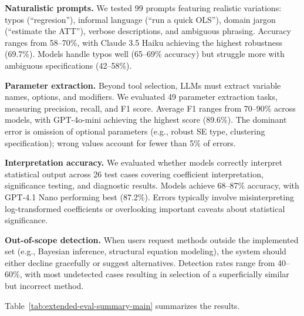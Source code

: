 \textbf{Naturalistic prompts.} We tested 99 prompts featuring realistic
variations: typos (``regresion''), informal language (``run a quick OLS''),
domain jargon (``estimate the ATT''), verbose descriptions, and ambiguous
phrasing. Accuracy ranges from 58--70\%, with Claude 3.5 Haiku achieving
the highest robustness (69.7\%). Models handle typos well (65--69\% accuracy)
but struggle more with ambiguous specifications (42--58\%).

\textbf{Parameter extraction.} Beyond tool selection, LLMs must extract
variable names, options, and modifiers. We evaluated 49 parameter extraction
tasks, measuring precision, recall, and F1 score. Average F1 ranges from
70--90\% across models, with GPT-4o-mini achieving the highest score (89.6\%).
The dominant error is omission of optional parameters (e.g., robust SE type,
clustering specification); wrong values account for fewer than 5\% of errors.

\textbf{Interpretation accuracy.} We evaluated whether models correctly
interpret statistical output across 26 test cases covering coefficient
interpretation, significance testing, and diagnostic results. Models
achieve 68--87\% accuracy, with GPT-4.1 Nano performing best (87.2\%).
Errors typically involve misinterpreting log-transformed coefficients
or overlooking important caveats about statistical significance.

\textbf{Out-of-scope detection.} When users request methods outside the
implemented set (e.g., Bayesian inference, structural equation modeling), the system should
either decline gracefully or suggest alternatives. Detection rates range
from 40--60\%, with most undetected cases resulting in selection of a
superficially similar but incorrect method.

Table~\ref{tab:extended-eval-summary-main} summarizes the results.

